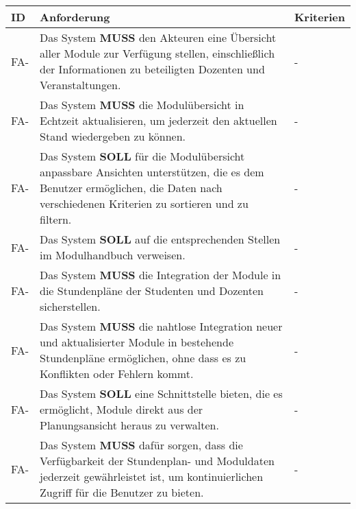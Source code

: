 \begin{tabular} {|p{}|p{11cm}|p{}|}
	\hline
	ID & Anforderung & Kriterien \\
	\hline
	FA-
	& Das System \textbf{MUSS} den Akteuren eine Übersicht aller Module zur Verfügung stellen, einschließlich der Informationen zu beteiligten Dozenten und Veranstaltungen. 
	& - \\
	\hline
	FA-
	& Das System \textbf{MUSS} die Modulübersicht in Echtzeit aktualisieren, um jederzeit den aktuellen Stand wiedergeben zu können. 
	& - \\
	\hline
	FA-
	& Das System \textbf{SOLL} für die Modulübersicht anpassbare Ansichten unterstützen, die es dem Benutzer ermöglichen, die Daten nach verschiedenen Kriterien zu sortieren und zu filtern. 
	& - \\
	\hline
	FA-
	& Das System \textbf{SOLL} auf die entsprechenden Stellen im Modulhandbuch verweisen. 
	& - \\
	\hline
	FA-
	& Das System \textbf{MUSS} die Integration der Module in die Stundenpläne der Studenten und Dozenten sicherstellen. 
	& - \\
	\hline
	FA-
	& Das System \textbf{MUSS} die nahtlose Integration neuer und aktualisierter Module in bestehende Stundenpläne ermöglichen, ohne dass es zu Konflikten oder Fehlern kommt. 
	& - \\
	\hline
	FA-
	& Das System \textbf{SOLL} eine Schnittstelle bieten, die es ermöglicht, Module direkt aus der Planungsansicht heraus zu verwalten. 
	& - \\
	\hline
	FA-
	& Das System \textbf{MUSS} dafür sorgen, dass die Verfügbarkeit der Stundenplan- und Moduldaten jederzeit gewährleistet ist, um kontinuierlichen Zugriff für die Benutzer zu bieten. 
	& - \\
	\hline
\end{tabular}

